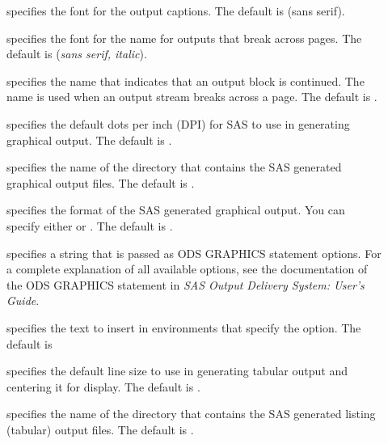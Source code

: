 \documentclass[article,oneside]{memoir}
\begin{document}
    \begin{description}
     \item[] specifies the font for the output captions.
     The default is  (\textsf{sans serif}).

     \item[] specifies the font for the  name
     for outputs that break across pages.
     The default is  (\textsf{\textit{sans serif, italic}}).

     \item[] specifies the name that indicates that an output
     block is continued. The name is used when an output stream breaks across a page.
     The default is .

    \item[] specifies the default dots per inch (DPI) for SAS to use in generating
    graphical output. The default is .

    \item[] specifies the name of the directory that contains the SAS
     generated graphical output files. The default is .

    \item[] specifies the format of the SAS
     generated graphical output. You can specify either
      or . The default is .

    \item[] specifies a string that is passed as
    ODS GRAPHICS statement options. For a complete explanation of all available options,
    see the documentation of the ODS GRAPHICS statement in
    \textit{SAS Output Delivery System: User's Guide}.

    \item[] specifies the text to insert in
     environments that specify
     the  option. The default is 

    \item[] specifies the default line size to use in generating tabular
    output and centering it for display. The default is .

     \item[] specifies the name of the directory that contains the SAS
     generated listing (tabular) output files. The default is .


\end{description}
\end{document}
